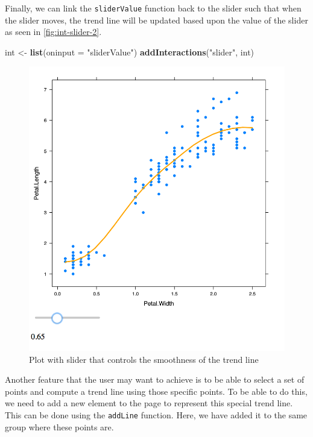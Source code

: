 \documentclass[11pt,]{report}
\newenvironment{Shaded}{\begin{snugshade}}{\end{snugshade}}
\newcommand{\KeywordTok}[1]{\textcolor[rgb]{0.13,0.29,0.53}{\textbf{#1}}}
\newcommand{\DataTypeTok}[1]{\textcolor[rgb]{0.13,0.29,0.53}{#1}}
\newcommand{\StringTok}[1]{\textcolor[rgb]{0.31,0.60,0.02}{#1}}
\newcommand{\NormalTok}[1]{#1}
\begin{document}
Finally, we can link the \texttt{sliderValue} function back to the
slider such that when the slider moves, the trend line will be updated
based upon the value of the slider as seen in
\autoref{fig:int-slider-2}.

\begin{Shaded}
\begin{Highlighting}[]
\NormalTok{int <-}\StringTok{ }\KeywordTok{list}\NormalTok{(}\DataTypeTok{oninput =} \StringTok{"sliderValue"}\NormalTok{)}
\KeywordTok{addInteractions}\NormalTok{(}\StringTok{"slider"}\NormalTok{, int)}
\end{Highlighting}
\end{Shaded}

\begin{figure}[H]

{\centering \includegraphics[width=0.7\linewidth,]{./fig/int-slider-2} 

}

\caption{\label{fig:int-slider-2} Plot with slider that controls the smoothness of the trend line}\label{fig:unnamed-chunk-73}
\end{figure}

Another feature that the user may want to achieve is to be able to
select a set of points and compute a trend line using those specific
points. To be able to do this, we need to add a new element to the page
to represent this special trend line. This can be done using the
\texttt{addLine} function. Here, we have added it to the same group
where these points are.
\end{document}
